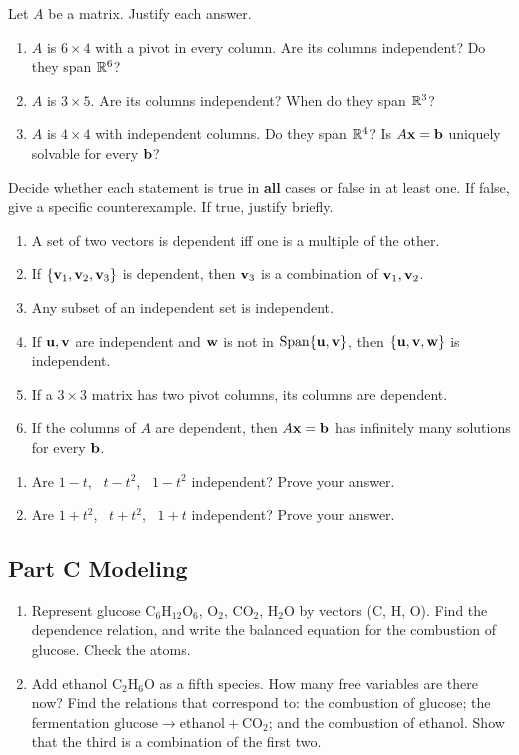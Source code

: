 \documentclass[11pt]{article}
\begin{document}
Let $A$ be a matrix. Justify each answer.
\begin{enumerate}
  \item $A$ is $6\times4$ with a pivot in every column. Are its columns independent? Do they span $\mathbb{R}^6$?
  \item $A$ is $3\times5$. Are its columns independent? When do they span $\mathbb{R}^3$?
  \item $A$ is $4\times4$ with independent columns. Do they span $\mathbb{R}^4$? Is $A\mathbf{x}=\mathbf{b}$ uniquely solvable for every $\mathbf{b}$?
\end{enumerate}

Decide whether each statement is true in \textbf{all} cases or false in at least one. If false, give a specific counterexample. If true, justify briefly.
\begin{enumerate}
  \item A set of two vectors is dependent iff one is a multiple of the other.
  \item If $\{\mathbf{v}_1,\mathbf{v}_2,\mathbf{v}_3\}$ is dependent, then $\mathbf{v}_3$ is a combination of $\mathbf{v}_1,\mathbf{v}_2$.
  \item Any subset of an independent set is independent.
  \item If $\mathbf{u},\mathbf{v}$ are independent and $\mathbf{w}$ is not in $\operatorname{Span}\{\mathbf{u},\mathbf{v}\}$, then $\{\mathbf{u},\mathbf{v},\mathbf{w}\}$ is independent.
  \item If a $3\times3$ matrix has two pivot columns, its columns are dependent.
  \item If the columns of $A$ are dependent, then $A\mathbf{x}=\mathbf{b}$ has infinitely many solutions for every $\mathbf{b}$.
\end{enumerate}

\begin{enumerate}
  \item Are $1-t$, \ $t-t^2$, \ $1-t^2$ independent? Prove your answer.
  \item Are $1+t^2$, \ $t+t^2$, \ $1+t$ independent? Prove your answer.
\end{enumerate}

\subsection*{Part C \quad Modeling}

\begin{enumerate}
  \item Represent glucose $\mathrm{C_6H_{12}O_6}$, $\mathrm{O_2}$, $\mathrm{CO_2}$, $\mathrm{H_2O}$ by vectors (C, H, O). Find the dependence relation, and write the balanced equation for the combustion of glucose. Check the atoms.
  \item Add ethanol $\mathrm{C_2H_6O}$ as a fifth species. How many free variables are there now? Find the relations that correspond to: the combustion of glucose; the fermentation $\mathrm{glucose}\to\mathrm{ethanol}+\mathrm{CO_2}$; and the combustion of ethanol. Show that the third is a combination of the first two.
\end{enumerate}
\end{document}
